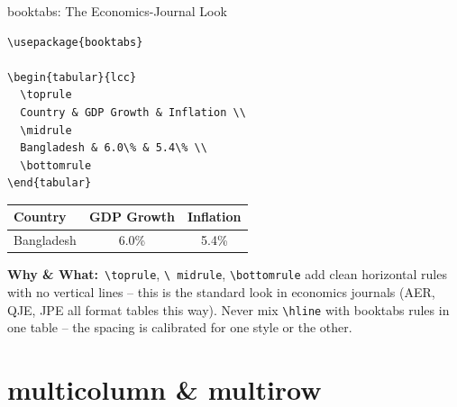\documentclass[11pt,aspectratio=169]{beamer}
\newcommand{\whybox}[1]{%
  \vspace{2pt}
  {\scriptsize\raggedright\textcolor{red!55!black}{\textbf{Why \& What:}}~#1\par}
}
\begin{document}
\begin{frame}[fragile]{booktabs: The Economics-Journal Look}
  \begin{lstlisting}
\usepackage{booktabs}

\begin{tabular}{lcc}
  \toprule
  Country & GDP Growth & Inflation \\
  \midrule
  Bangladesh & 6.0\% & 5.4\% \\
  \bottomrule
\end{tabular}
  \end{lstlisting}
  \begin{outputbox}
    \small
    \begin{tabular}{lcc}
      \toprule
      Country & GDP Growth & Inflation \\
      \midrule
      Bangladesh & 6.0\% & 5.4\% \\
      \bottomrule
    \end{tabular}
  \end{outputbox}
  \whybox{\texttt{\textbackslash toprule}, \texttt{\textbackslash
  midrule}, \texttt{\textbackslash bottomrule} add clean horizontal
  rules with no vertical lines -- this is the standard look in
  economics journals (AER, QJE, JPE all format tables this way). Never
  mix \texttt{\textbackslash hline} with booktabs rules in one table --
  the spacing is calibrated for one style or the other.}
\end{frame}

\section{multicolumn \& multirow}
\end{document}
